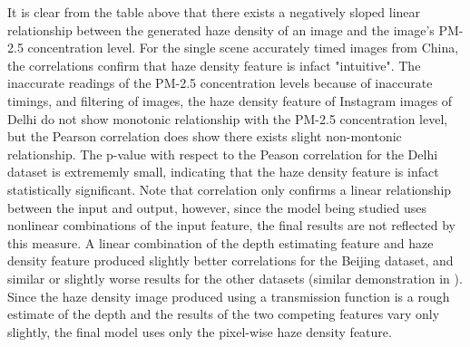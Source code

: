 \documentclass{article}
\begin{document}
It is clear from the table above that there exists a negatively sloped linear relationship between the generated haze density of an image and the image's PM-2.5 concentration level. For the single scene accurately timed images from China, the correlations confirm that haze density feature is infact "intuitive". The inaccurate readings of the PM-2.5 concentration levels because of inaccurate timings, and filtering of images, the haze density feature of Instagram images of Delhi do not show monotonic relationship with the PM-2.5 concentration level, but the Pearson correlation does show there exists slight non-montonic relationship. The p-value with respect to the Peason correlation for the Delhi dataset is extrememly small, indicating that the haze density feature is infact statistically significant. Note that correlation only confirms a linear relationship between the input and output, however, since the model being studied uses nonlinear combinations of the input feature, the final results are not reflected by this measure. A linear combination of the depth estimating feature and haze density feature produced slightly better correlations for the Beijing dataset, and similar or slightly worse results for the other datasets (similar demonstration in \cite{Usergen}). Since the haze density image produced using a transmission function is a rough estimate of the depth \cite{dcp} and the results of the two competing features vary only slightly, the final model uses only the pixel-wise haze density feature.
\end{document}
